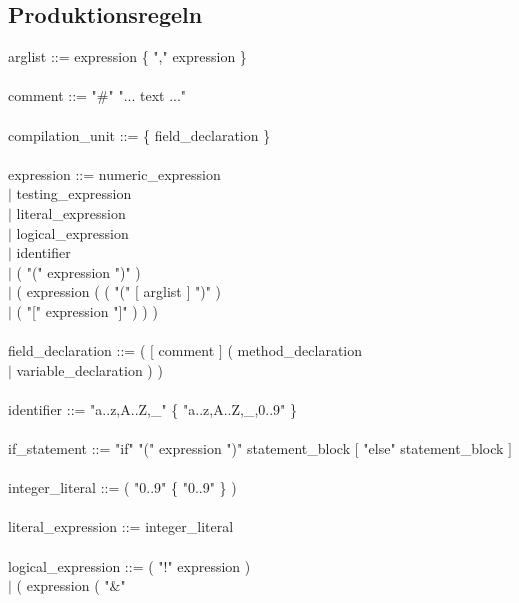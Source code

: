 \documentclass[10pt,a4paper,titlepage]{article}
\begin{document}
\subsection{Produktionsregeln}
\begin{ttfamily}
arglist ::=  expression \{ "," expression \}\\
\\
comment ::= "\#" "... text ..."\\
\\
compilation\_unit ::= \{ field\_declaration \}\\
\\
expression ::= numeric\_expression \\
		\hspace*{3cm}$\mid$ testing\_expression\\
		\hspace*{3cm}$\mid$ literal\_expression\\
		\hspace*{3cm}$\mid$ logical\_expression\\
		\hspace*{3cm}$\mid$ identifier\\
		\hspace*{3cm}$\mid$ ( "(" expression ")" )\\
		\hspace*{3cm}$\mid$ ( expression ( ( "(" $[$ arglist $]$ ")" )\\
					\hspace*{6.3cm}$\mid$ ( "[" expression "]" ) ) )\\
\\					
field\_declaration ::= ( $[$ comment $]$ ( method\_declaration \\
					\hspace*{7cm}$\mid$ variable\_declaration ) )\\
\\					
identifier ::= "a..z,A..Z,\_" \{ "a..z,A..Z,\_,0..9" \}\\
\\
if\_statement ::= "if" "(" expression ")" statement\_block $[$ "else" statement\_block $]$\\
\\
integer\_literal ::= ( "0..9" \{ "0..9" \} )\\
\\
literal\_expression ::= integer\_literal\\
\\
logical\_expression ::= ( "!" expression )\\
		\hspace*{4.5cm}$\mid$ ( expression ( "\&" \\

\end{ttfamily}
\end{document}
